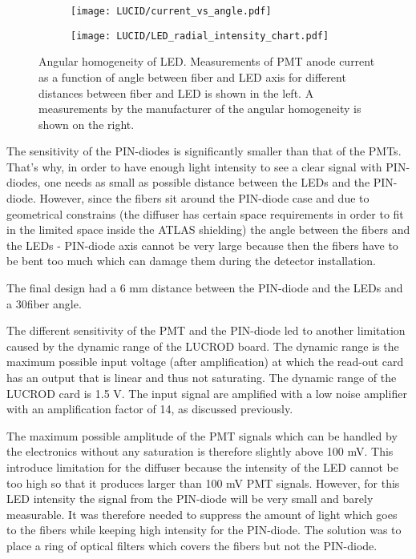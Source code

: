 \begin{figure}
\begin{subfigure}{.46\textwidth}
  \centering
  \texttt{[image: LUCID/current\_vs\_angle.pdf]}
\end{subfigure}
\begin{subfigure}{.51\textwidth}
  \centering
  \texttt{[image: LUCID/LED\_radial\_intensity\_chart.pdf]}
\end{subfigure}

\caption{Angular homogeneity of LED. 
Measurements of PMT anode current as a function of angle between fiber and LED axis for different distances between fiber and LED is shown in the left.
A measurements by the manufacturer of the angular homogeneity is shown on the right.}
\label{fig:AngularDistributionOfLED}
\end{figure}

The sensitivity of the PIN-diodes is significantly smaller than that of the PMTs.
That's why, in order to have enough light intensity to see a clear signal with PIN-diodes, one needs as small as possible
distance between the LEDs and the PIN-diode. However, since the fibers sit around the PIN-diode case and due to geometrical constrains 
(the diffuser has certain space requirements in order to fit in the limited space inside the ATLAS shielding) 
the angle between the fibers and the LEDs - PIN-diode axis cannot be very large because then
the fibers have to be bent too much which can damage them during the detector installation.

The final design had a 6 mm distance between the PIN-diode and the LEDs and a 30\degree fiber angle.

The different sensitivity of the PMT and the PIN-diode led to another limitation caused by the dynamic range of the LUCROD board.
The dynamic range is the maximum possible input voltage (after amplification) at which the read-out card has an output that is linear and thus not saturating.
The dynamic range of the LUCROD card is 1.5 V. 
The input signal are amplified with a low noise amplifier with an amplification factor of 14, as discussed previously. 

The maximum possible amplitude of the PMT signals which can be handled by the electronics without any saturation is therefore slightly above 100 mV.
This introduce limitation for the diffuser because the intensity of the LED cannot be too high so that it produces larger than 100 mV PMT signals.
However, for this LED intensity the signal from the PIN-diode will be very small and barely measurable.
It was therefore needed to suppress the amount of light which goes to the fibers while keeping high intensity for the PIN-diode.
The solution was to place a ring of optical filters which covers the fibers but not the PIN-diode.

